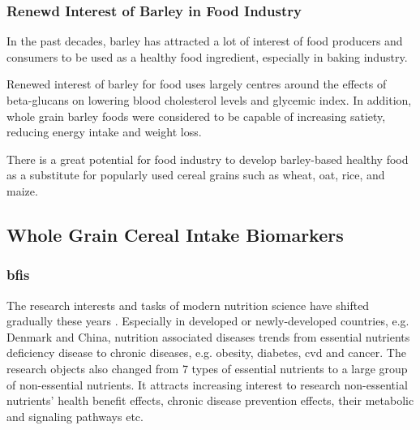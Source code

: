 
\subsubsection{Renewd Interest of Barley in Food Industry}
In the past decades, barley has attracted a lot of interest of food producers and consumers to be used as a healthy food ingredient\cite{Baik2008}, especially in baking industry\cite{Sullivan2013}.

Renewed interest of barley for food uses largely centres around the effects of beta-glucans on lowering blood cholesterol levels and glycemic index. In addition, whole grain barley foods were considered to be capable of increasing satiety, reducing energy intake and weight loss\cite{Baik2008}.

There is a great potential for food industry to develop barley-based healthy food as a substitute for popularly used cereal grains such as wheat, oat, rice, and maize\cite{Baik2008}.

\subsection{Whole Grain Cereal Intake Biomarkers}
\subsubsection{\acrfull{bfis}}
The research interests and tasks of modern nutrition science have shifted gradually these years \cite{Scalbert2014}. Especially in developed or newly-developed countries, e.g. Denmark and China, nutrition associated diseases trends from essential nutrients deficiency disease to chronic diseases, e.g. obesity, diabetes, \acrshort{cvd} and cancer. The research objects also changed from 7 types of essential nutrients to a large group of non-essential nutrients. It attracts increasing interest to research non-essential nutrients' health benefit effects, chronic disease prevention effects, their metabolic and signaling pathways etc.

